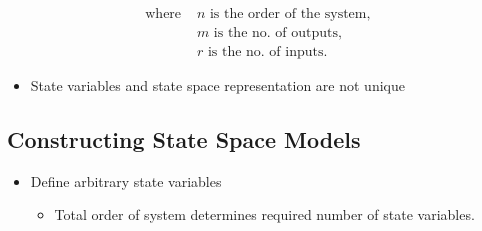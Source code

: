 \documentclass[a4paper]{article}
\begin{document}
\begin{center}
    \begin{align*}
        \text{where }&n\text{ is the order of the system},\\
        &m\text{ is the no. of outputs},\\
        &r\text{ is the no. of inputs}.
    \end{align*}
\end{center}
\begin{itemize}
    \item State variables and state space representation are not unique
\end{itemize}

\subsection{Constructing State Space Models}
\begin{itemize}
    \item Define arbitrary state variables
    \begin{itemize}[label=$\circ$]
        \item Total order of system determines required number of state variables.
    \end{itemize}
\end{itemize}
\end{document}
